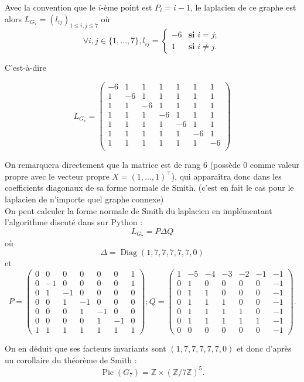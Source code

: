 \documentclass{article}
\newcommand{\Pic}{\operatorname{Pic}}
\newcommand{\Diag}{\operatorname{Diag}}
\begin{document}
Avec la convention que le $i$-ème point est $P_i = i-1$, le laplacien de ce graphe est alors $L_{G_7} = (l_{ij})_{1\leq i,j\leq 7}$ où
\[\forall i,j\in \{1,\dots,7\}, l_{ij} = \begin{cases}
    -6 & \textbf{si } i=j;\\
    1 & \textbf{si } i\neq j.
\end{cases}\]

C'est-à-dire

\[L_{G_7} = \begin{pmatrix}
-6&1&1&1&1&1&1\\
1&-6&1&1&1&1&1\\
1&1&-6&1&1&1&1\\
1&1&1&-6&1&1&1\\
1&1&1&1&-6&1&1\\
1&1&1&1&1&-6&1\\
1&1&1&1&1&1&-6\\
\end{pmatrix}\]

On remarquera directement que la matrice est de rang $6$ (possède $0$ comme valeur propre avec le vecteur propre $X = (1,...,1)^\top$), qui apparaîtra donc dans les coefficients diagonaux de sa forme normale de Smith. (c'est en fait le cas pour le laplacien de n'importe quel graphe connexe)\\
On peut calculer la forme normale de Smith du laplacien en implémentant l'algorithme discuté dans \cite{2} sur Python :
\[L_{G_7} = P\Delta Q\]
où
\[\Delta = \Diag(1,7,7,7,7,7,0)\]
et
\[P = \begin{pmatrix} 0&0&0&0&0&0&1\\
0&-1&0&0&0&0&1\\
0&1&-1&0&0&0&0\\
0&0&1&-1&0&0&0\\
0&0&0&1&-1&0&0\\
0&0&0&0&1&-1&0\\
1&1&1&1&1&1&1
\end{pmatrix} ; Q = \begin{pmatrix} 1&-5&-4&-3&-2&-1&-1\\
0&1&0&0&0&0&-1\\
0&1&1&0&0&0&-1\\
0&1&1&1&0&0&-1\\
0&1&1&1&1&0&-1\\
0&1&1&1&1&1&-1\\
0&0&0&0&0&0&-1\end{pmatrix}. \]

On en déduit que ses facteurs invariants sont $(1,7,7,7,7,7,0)$ et donc d'après un corollaire du théorème de Smith :
\[\Pic(G_7) = \mathbb{Z} \times (\mathbb{Z}/7\mathbb{Z})^5.\]
\end{document}
